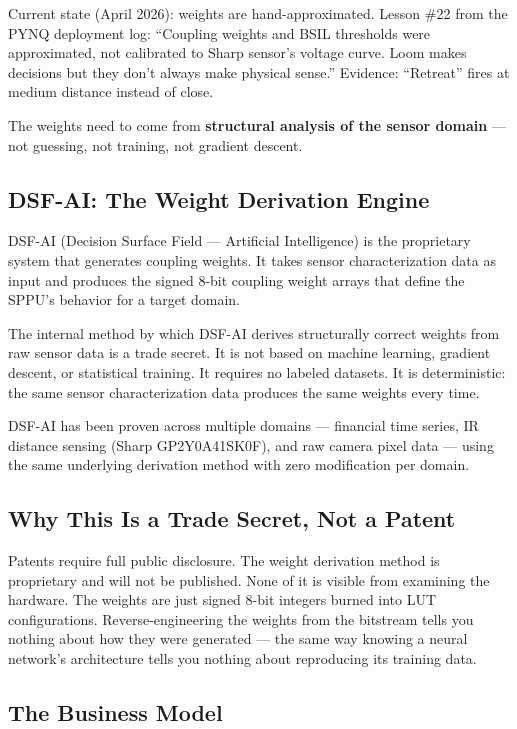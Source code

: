 \documentclass[11pt,a4paper]{article}
\begin{document}
Current state (April 2026): weights are hand-approximated. Lesson \#22 from the PYNQ deployment log: ``Coupling weights and BSIL thresholds were approximated, not calibrated to Sharp sensor's voltage curve. Loom makes decisions but they don't always make physical sense.'' Evidence: ``Retreat'' fires at medium distance instead of close.

The weights need to come from \textbf{structural analysis of the sensor domain} --- not guessing, not training, not gradient descent.

\subsection{DSF-AI: The Weight Derivation Engine}

DSF-AI (Decision Surface Field --- Artificial Intelligence) is the proprietary system that generates coupling weights. It takes sensor characterization data as input and produces the signed 8-bit coupling weight arrays that define the SPPU's behavior for a target domain.

The internal method by which DSF-AI derives structurally correct weights from raw sensor data is a trade secret. It is not based on machine learning, gradient descent, or statistical training. It requires no labeled datasets. It is deterministic: the same sensor characterization data produces the same weights every time.

DSF-AI has been proven across multiple domains --- financial time series, IR distance sensing (Sharp GP2Y0A41SK0F), and raw camera pixel data --- using the same underlying derivation method with zero modification per domain.

\subsection{Why This Is a Trade Secret, Not a Patent}

Patents require full public disclosure. The weight derivation method is proprietary and will not be published. None of it is visible from examining the hardware. The weights are just signed 8-bit integers burned into LUT configurations. Reverse-engineering the weights from the bitstream tells you nothing about how they were generated --- the same way knowing a neural network's architecture tells you nothing about reproducing its training data.

\subsection{The Business Model}
\end{document}
